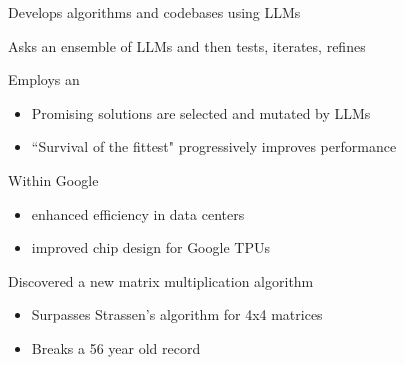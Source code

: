 \begin{frame}
    
    Develops algorithms and codebases using LLMs

    \vspace{0.5em}
    Asks an ensemble of LLMs and then tests, iterates, refines

    \vspace{0.5em}
    \vspace{0.5em}
    \vspace{0.5em}
    Employs an 

    \vspace{0.5em}
    \begin{itemize}
        \item Promising solutions are selected and mutated by LLMs 
        \vspace{0.5em}
        \item ``Survival of the fittest" progressively improves performance
    \end{itemize}

\end{frame}

\begin{frame}
    

    Within Google

    \begin{itemize}
        \item enhanced efficiency in data centers 
        \vspace{0.5em}
        \item improved chip design for Google TPUs 
        \vspace{0.5em}
    \end{itemize}

        \vspace{0.5em}
        \vspace{0.5em}
    Discovered a new matrix multiplication algorithm

    \begin{itemize}
        \item Surpasses Strassen's algorithm for 4x4 matrices
        \vspace{0.5em}
        \item Breaks a 56 year old record
    \end{itemize}

\end{frame}

